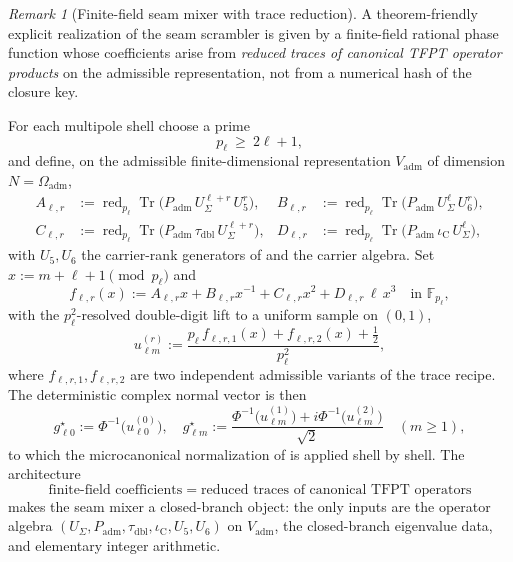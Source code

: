 \documentclass[11pt,a4paper]{article}
\theoremstyle{definition}
\theoremstyle{remark}
\newtheorem*{remark}{Remark}
\newcommand{\taudbl}{\tau_{\mathrm{dbl}}}
\newcommand{\iC}{\iota_{\mathrm C}}
\newcommand{\Padm}{P_{\mathrm{adm}}}
\begin{document}
\begin{remark}[Finite-field seam mixer with trace reduction]
\label{rem:finite-field-seam-mixer}
A theorem-friendly explicit realization of the seam scrambler is given by a finite-field rational
phase function whose coefficients arise from \emph{reduced traces of canonical TFPT operator
products} on the admissible representation, not from a numerical hash of the closure key.

For each multipole shell choose a prime
\[
p_\ell\ \ge\ 2\ell+1,
\]
and define, on the admissible finite-dimensional representation $V_{\mathrm{adm}}$ of dimension
$N=\Omega_{\mathrm{adm}}$,
\begin{align}
A_{\ell,r}
&:=\operatorname{red}_{p_\ell}
\operatorname{Tr}\bigl(\Padm\,U_\Sigma^{\ell+r}\,U_5^{r}\bigr),
&
B_{\ell,r}
&:=\operatorname{red}_{p_\ell}
\operatorname{Tr}\bigl(\Padm\,U_\Sigma^{\ell}\,U_6^{r}\bigr),
\\
C_{\ell,r}
&:=\operatorname{red}_{p_\ell}
\operatorname{Tr}\bigl(\Padm\,\taudbl\,U_\Sigma^{\ell+r}\bigr),
&
D_{\ell,r}
&:=\operatorname{red}_{p_\ell}
\operatorname{Tr}\bigl(\Padm\,\iC\,U_\Sigma^{\ell}\bigr),
\end{align}
with $U_5,U_6$ the carrier-rank generators of  and the carrier
algebra. Set $x:=m+\ell+1\pmod{p_\ell}$ and
\[
f_{\ell,r}(x)
:=
A_{\ell,r}x+B_{\ell,r}x^{-1}+C_{\ell,r}x^2+D_{\ell,r}\,\ell\,x^3
\quad
\text{in }\mathbb F_{p_\ell},
\]
with the $p_\ell^2$-resolved double-digit lift to a uniform sample on $(0,1)$,
\[
u_{\ell m}^{(r)}
:=
\frac{p_\ell\,f_{\ell,r,1}(x)+f_{\ell,r,2}(x)+\tfrac{1}{2}}{p_\ell^2},
\]
where $f_{\ell,r,1},f_{\ell,r,2}$ are two independent admissible variants of the trace recipe.
The deterministic complex normal vector is then
\[
g_{\ell 0}^{\star}:=\Phi^{-1}\!\bigl(u_{\ell 0}^{(0)}\bigr),
\quad
g_{\ell m}^{\star}:=
\frac{\Phi^{-1}\!\bigl(u_{\ell m}^{(1)}\bigr)
+i\Phi^{-1}\!\bigl(u_{\ell m}^{(2)}\bigr)}{\sqrt{2}}
\quad(m\ge1),
\]
to which the microcanonical normalization of  is applied
shell by shell. The architecture
\[
\boxed{\;\text{finite-field coefficients}\;=\;\text{reduced traces of canonical TFPT operators}\;}
\]
makes the seam mixer a closed-branch object: the only inputs are the operator algebra
$(U_\Sigma,\Padm,\taudbl,\iC,U_5,U_6)$ on $V_{\mathrm{adm}}$, the closed-branch eigenvalue data,
and elementary integer arithmetic.
\end{remark}
\end{document}
